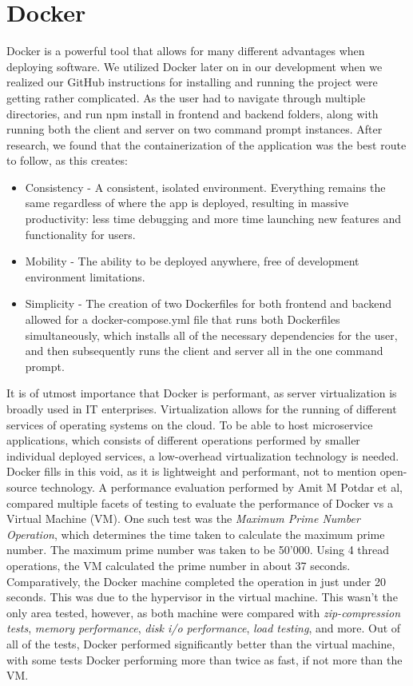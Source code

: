 \section{Docker}

Docker is a powerful tool that allows for many different advantages when deploying software. We utilized Docker later on in our development when we realized our GitHub instructions for installing and running the project were getting rather complicated. As the user had to navigate through multiple directories, and run npm install in frontend and backend folders, along with running both the client and server on two command prompt instances. After research, we found that the containerization of the application was the best route to follow, as this creates:
\begin{itemize}
    \item Consistency - A consistent, isolated environment. Everything remains the same regardless of where the app is deployed, resulting in massive productivity: less time debugging and more time launching new features and functionality for users.
    \item Mobility - The ability to be deployed anywhere, free of development environment limitations. \item Simplicity - The creation of two Dockerfiles for both frontend and backend allowed for a docker-compose.yml file that runs both Dockerfiles simultaneously, which installs all of the necessary dependencies for the user, and then subsequently runs the client and server all in the one command prompt.
\end{itemize}

It is of utmost importance that Docker is performant, as server virtualization is broadly used in IT enterprises. Virtualization allows for the running of different services of operating systems on the cloud. To be able to host microservice applications, which consists of different operations performed by smaller individual deployed services, a low-overhead virtualization technology is needed. Docker fills in this void, as it is lightweight and performant, not to mention open-source technology. A performance evaluation performed by Amit M Potdar et al, compared multiple facets of testing to evaluate the performance of Docker vs a Virtual Machine (VM). One such test was the \textit{Maximum Prime Number Operation}, which determines the time taken to calculate the maximum prime number. The maximum prime number was taken to be 50'000. Using 4 thread operations, the VM calculated the prime number in about 37 seconds. Comparatively, the Docker machine completed the operation in just under 20 seconds. This was due to the hypervisor in the virtual machine. This wasn't the only area tested, however, as both machine were compared with \textit{zip-compression tests}, \textit{memory performance}, \textit{disk i/o performance}, \textit{load testing}, and more. Out of all of the tests, Docker performed significantly better than the virtual machine, with some tests Docker performing more than twice as fast, if not more than the VM\cite{POTDAR20201419}.


